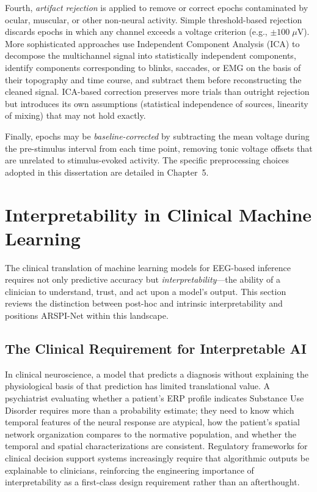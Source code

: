 Fourth, \emph{artifact rejection} is applied to remove or correct epochs contaminated by ocular, muscular, or other non-neural activity. Simple threshold-based rejection discards epochs in which any channel exceeds a voltage criterion (e.g., $\pm 100\;\mu$V). More sophisticated approaches use Independent Component Analysis (ICA) \cite{delorme_eeglab_2004} to decompose the multichannel signal into statistically independent components, identify components corresponding to blinks, saccades, or EMG on the basis of their topography and time course, and subtract them before reconstructing the cleaned signal. ICA-based correction preserves more trials than outright rejection but introduces its own assumptions (statistical independence of sources, linearity of mixing) that may not hold exactly.

Finally, epochs may be \emph{baseline-corrected} by subtracting the mean voltage during the pre-stimulus interval from each time point, removing tonic voltage offsets that are unrelated to stimulus-evoked activity. The specific preprocessing choices adopted in this dissertation are detailed in Chapter~5.


\section{Interpretability in Clinical Machine Learning}
\label{sec:interpretability_background}

The clinical translation of machine learning models for EEG-based inference requires not only predictive accuracy but \emph{interpretability}---the ability of a clinician to understand, trust, and act upon a model's output. This section reviews the distinction between post-hoc and intrinsic interpretability and positions ARSPI-Net within this landscape.

\subsection{The Clinical Requirement for Interpretable AI}

In clinical neuroscience, a model that predicts a diagnosis without explaining the physiological basis of that prediction has limited translational value. A psychiatrist evaluating whether a patient's ERP profile indicates Substance Use Disorder requires more than a probability estimate; they need to know which temporal features of the neural response are atypical, how the patient's spatial network organization compares to the normative population, and whether the temporal and spatial characterizations are consistent. Regulatory frameworks for clinical decision support systems increasingly require that algorithmic outputs be explainable to clinicians, reinforcing the engineering importance of interpretability as a first-class design requirement rather than an afterthought.


